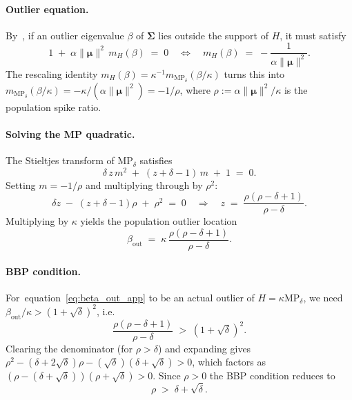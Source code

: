 \documentclass{article}
\def\eqref#1{equation~\ref{#1}}
\def\vmu{{\bm{\mu}}}
\def\mSigma{{\bm{\Sigma}}}
\begin{document}
\paragraph{Outlier equation.}
By~\citet{benaych2011eigenvalues}, if an outlier eigenvalue $\beta$ of $\mSigma$ lies outside the support of $H$, it must satisfy
\begin{equation}\label{eq:pop_BGN}
    1 \;+\; \alpha\|\vmu\|^2\, m_H(\beta) \;=\; 0
    \quad\Longleftrightarrow\quad
    m_H(\beta) \;=\; -\frac{1}{\alpha\|\vmu\|^2}.
\end{equation}
The rescaling identity $m_H(\beta)=\kappa^{-1} m_{\mathrm{MP}_\delta}(\beta/\kappa)$ turns this into $m_{\mathrm{MP}_\delta}(\beta/\kappa) = -\kappa/(\alpha\|\vmu\|^2) = -1/\rho$, where $\rho := \alpha\|\vmu\|^2/\kappa$ is the population spike ratio.

\paragraph{Solving the MP quadratic.}
The Stieltjes transform of $\mathrm{MP}_\delta$ satisfies
\begin{equation}\label{eq:MP_quadratic}
    \delta\, z\, m^2 \;+\; (z+\delta-1)\,m \;+\; 1 \;=\; 0.
\end{equation}
Setting $m=-1/\rho$ and multiplying through by $\rho^2$:
\[
    \delta z \;-\; (z+\delta-1)\rho \;+\; \rho^2 \;=\; 0
    \quad\Longrightarrow\quad
    z \;=\; \frac{\rho(\rho-\delta+1)}{\rho-\delta}.
\]
Multiplying by $\kappa$ yields the population outlier location
\begin{equation}\label{eq:beta_out_app}
    \beta_\mathrm{out} \;=\; \kappa\,\frac{\rho(\rho-\delta+1)}{\rho-\delta}.
\end{equation}

\paragraph{BBP condition.}
For~\eqref{eq:beta_out_app} to be an actual outlier of $H=\kappa\mathrm{MP}_\delta$, we need $\beta_\mathrm{out}/\kappa>(1+\sqrt\delta)^2$, i.e.
\[
    \frac{\rho(\rho-\delta+1)}{\rho-\delta} \;>\; (1+\sqrt\delta)^2.
\]
Clearing the denominator (for $\rho>\delta$) and expanding gives $\rho^2 - (\delta+2\sqrt\delta)\rho - (\sqrt\delta)(\delta+\sqrt\delta) > 0$, which factors as $(\rho-(\delta+\sqrt\delta))(\rho+\sqrt\delta)>0$. Since $\rho>0$ the BBP condition reduces to
\[
    \rho \;>\; \delta+\sqrt\delta.
\]
\end{document}
